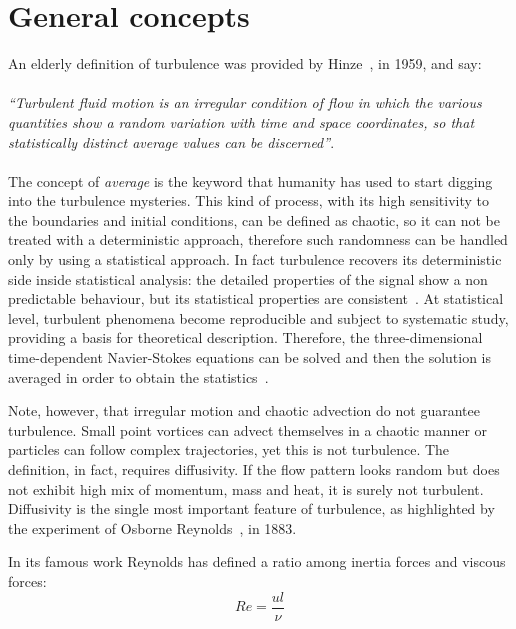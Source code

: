 \section{General concepts}
An elderly definition of turbulence was provided by Hinze~\cite{Hinze}, in 1959, and say:\\~\\
\emph{``Turbulent fluid motion is an irregular condition of flow in which the various quantities show a random variation with time and space coordinates, so that statistically distinct average values can be discerned''}.\\~\\
The concept of \emph{average} is the keyword that humanity has used to start digging into the turbulence mysteries.
This kind of process, with its high sensitivity to the boundaries and initial conditions, can be defined as chaotic, so it can not be treated with a deterministic approach, therefore such randomness can be handled only by using a statistical approach.
In fact turbulence recovers its deterministic side inside statistical analysis: the detailed properties of the signal show a non predictable behaviour, but its statistical properties are consistent~\cite{Frisch}.
At statistical level, turbulent phenomena become reproducible and subject to systematic study, providing a basis for theoretical description. Therefore, the three-dimensional time-dependent Navier-Stokes equations can be solved and then the solution is averaged in order to obtain the statistics~\cite{Durbin}. 
\par
Note, however, that irregular motion and chaotic advection do not guarantee turbulence. Small point vortices can advect themselves in a chaotic manner or particles can follow complex trajectories, yet this is not turbulence. The definition, in fact, requires diffusivity. If the flow pattern looks random but does not exhibit high mix of momentum, mass and heat, it is surely not turbulent. Diffusivity is the single most important feature of turbulence, as highlighted by the experiment of Osborne Reynolds~\cite{Reynolds}, in 1883.
\par
In its famous work Reynolds has defined a ratio among inertia forces and viscous forces:
\begin{equation}
Re = \frac{ul}{\nu}
\end{equation}
